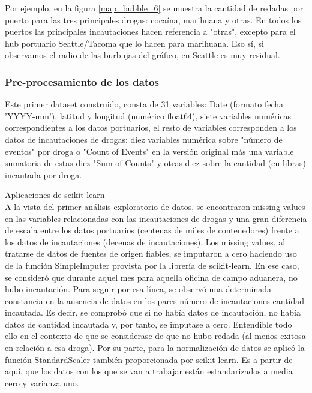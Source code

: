 \documentclass[12pt]{article}
\begin{document}
		Por ejemplo, en la figura \ref{map_bubble_6} se muestra la cantidad de redadas por puerto para las tres principales drogas: cocaína, marihuana y otras. En todos los puertos las principales incautaciones hacen referencia a "otras", excepto para el hub portuario Seattle/Tacoma que lo hacen para marihuana. Eso sí, si observamos el radio de las burbujas del gráfico, en Seattle es muy residual.
		
		
		
		\subsubsection{\label{preprocessing}Pre-procesamiento de los datos}
		Este primer dataset construido, consta de 31 variables: Date (formato fecha 'YYYY-mm'), latitud y longitud (numérico float64), siete variables numéricas correspondientes a los datos portuarios, el resto de variables corresponden a los datos de incautaciones de drogas: diez variables numérica sobre "número de eventos" por droga o "Count of Events" en la versión original más una variable sumatoria de estas diez "Sum of Counts" y otras diez sobre la cantidad (en libras) incautada por droga.
		
		
		\underline{Aplicaciones de scikit-learn}\\
		A la vista del primer análisis exploratorio de datos, se encontraron missing values en las variables relacionadas con las incautaciones de drogas y una gran diferencia de escala entre los datos portuarios (centenas de miles de contenedores) frente a los datos de incautaciones (decenas de incautaciones). Los missing values, al tratarse de datos de fuentes de origen fiables, se imputaron a cero haciendo uso de la función SimpleImputer provista por la librería de scikit-learn. En ese caso, se consideró que durante aquel mes para aquella oficina de campo aduanera, no hubo incautación. Para seguir por esa línea, se observó una determinada constancia en la ausencia de datos en los pares número de incautaciones-cantidad incautada. Es decir, se comprobó que si no había datos de incautación, no había datos de cantidad incautada y, por tanto, se imputase a cero. Entendible todo ello en el contexto de que se considerase de que no hubo redada (al menos exitosa en relación a esa droga). Por su parte, para la normalización de datos se aplicó la función StandardScaler también proporcionada por scikit-learn. Es a partir de aquí, que los datos con los que se van a trabajar están estandarizados a media cero y varianza uno.
		
\end{document}
